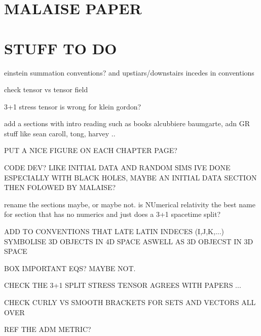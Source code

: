\documentclass[11pt]{report}  %
\numberwithin{equation}{section}
\begin{document}







 \chapter{MALAISE PAPER}

 






% 







\chapter{STUFF TO DO}


einstein summation conventions? and upstiars/downstairs incedes in conventions

check tensor vs tensor field

3+1 stress tensor is wrong for klein gordon?

add a sections with intro reading such as books alcubbiere baumgarte, adn GR stuff like sean caroll, tong, harvey ..

PUT A NICE FIGURE ON EACH CHAPTER PAGE?

CODE DEV? LIKE INITIAL DATA AND RANDOM SIMS IVE DONE ESPECIALLY WITH BLACK HOLES, MAYBE AN INITIAL DATA SECTION THEN FOLOWED BY MALAISE?

rename the sections maybe, or maybe not. is NUmerical relativity the best name for section that has no numerics and just does a 3+1 spacetime split?

ADD TO CONVENTIONS THAT LATE LATIN INDECES (I,J,K,...) SYMBOLISE 3D OBJECTS IN 4D SPACE ASWELL AS 3D OBJECST IN 3D SPACE

BOX IMPORTANT EQS? MAYBE NOT.

CHECK THE 3+1 SPLIT STRESS TENSOR AGREES WITH PAPERS ...

CHECK CURLY VS SMOOTH BRACKETS FOR SETS AND VECTORS ALL OVER

REF THE ADM METRIC?
\end{document}
